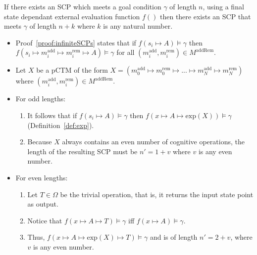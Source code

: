\begin{lemma}\label{lemma:infiniteSCPLength}
If there exists an SCP which meets a goal condition $\gamma$ of length $n$, using a final state dependant external evaluation function $f()$ then there exists an SCP that meets $\gamma$ of length $n+k$ where $k$ is any natural number.
\end{lemma}
\begin{bulletProof} \label{proof:infiniteSCPLength}

\begin{itemize}
\item Proof~\ref{proof:infiniteSCPs} states that if $f(s_i \longmapsto A)\models \gamma$ then $f(s_i \longmapsto m^\text{add}_i \longmapsto m^\text{rem}_i \longmapsto A) \models \gamma$ for all $(m^\text{add}_i, m^\text{rem}_i) \in M^\text{addRem}$.
\item Let $X$ be a pCTM of the form $X=(m^\text{add}_0 \longmapsto m^\text{rem}_0 \longmapsto ... \longmapsto m^\text{add}_N \longmapsto m^\text{rem}_{N})$ where $(m^\text{add}_i, m^\text{rem}_i) \in M^\text{addRem}$.
\item For odd lengths:
\begin{enumerate}
\item  It follows that if $f(s_i \longmapsto A)\models \gamma$ then $f(x \longmapsto A \longmapsto \textrm{exp}(X))\models \gamma$ (Definition~\ref{def:exp}).
\item Because $X$ always contains an even number of cognitive operations, the length of the resulting SCP must be $n' = 1+v$ where $v$ is any even number.
\end{enumerate}
\item For even lengths:
\begin{enumerate}
\item Let $T \in \Omega$ be the trivial operation, that is, it returns the input state point as output.
\item Notice that $f(x \longmapsto A \longmapsto T) \models \gamma$ iff $f(x \longmapsto A) \models \gamma$.
\item Thus, $f(x \longmapsto A \longmapsto \textrm{exp}(X) \longmapsto T )\models \gamma$ and is of length $n' = 2+v$, where $v$ is any even number.
\end{enumerate}
\end{itemize}

\end{bulletProof}


